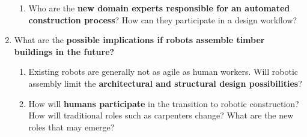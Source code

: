 \begin{enumerate}
\begin{enumerate}
    	\item Who are the \textbf{new domain experts responsible for an automated construction process}? How can they participate in a design workflow?
    
    \end{enumerate}
    
    \item What are the \textbf{possible implications if robots assemble timber buildings in the future?}
    
    \begin{enumerate}
    	\item Existing robots are generally not as agile as human workers. Will robotic assembly limit the \textbf{architectural and structural design possibilities}?
    
    	\item How will \textbf{humans participate} in the transition to robotic construction? How will traditional roles such as carpenters change? What are the new roles that may emerge?
    
    \end{enumerate}
\end{enumerate}

